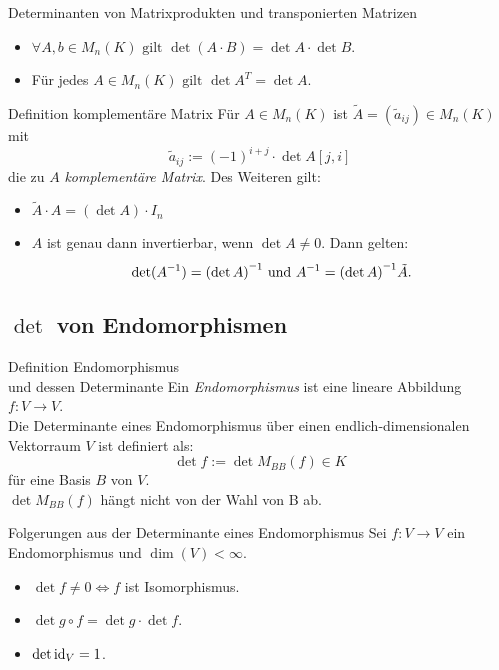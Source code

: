 \documentclass[main.tex]{subfiles}
\begin{document}
\begin{karte}{Determinanten von Matrixprodukten und transponierten Matrizen}
    \begin{itemize}
        \item \(\forall A,b \in M_n(K) \text{ gilt } 
        \det(A \cdot B) = \det A \cdot \det B\).
        \item Für jedes \(A \in M_n(K) \text{ gilt } 
        \det A^T = \det A\).
    \end{itemize}
\end{karte}
\begin{karte}{Definition komplementäre Matrix}
    Für \(A \in M_n(K)\) ist \(\tilde{A} = (\tilde{a}_{ij}) \in M_n(K)\) mit
    \[\tilde{a}_{ij} := {(-1)}^{i+j} \cdot \det A[j,i]\]
    die zu \(A\) \textit{komplementäre Matrix}.
    Des Weiteren gilt:
    \begin{itemize}
        \item \(\tilde{A} \cdot A = (\det A) \cdot I_n\)
        \item \(A\) ist genau dann invertierbar, wenn \(\det A \neq 0\). Dann gelten: 
        \[\det(\inverse A) = \inverse{(\det A)} \text{ und }
         \inverse A = \inverse{(\det A)} \tilde{A}.\]
    \end{itemize}
\end{karte}

\subsection*{\( \det \) von Endomorphismen}

\begin{karte}{Definition Endomorphismus\\und dessen Determinante}
    Ein \textit{Endomorphismus} ist eine lineare Abbildung 
    \( f: V \rightarrow V \).\\
    Die Determinante eines Endomorphismus über einen endlich-dimensionalen 
    Vektorraum \(V\) ist definiert als:
    \[ \det f := \det M_{BB}(f) \in K \]
    für eine Basis \(B\) von \(V\).\\
    \(\det M_{BB}(f)\) hängt nicht von der Wahl von B ab. 
\end{karte}
\begin{karte}{Folgerungen aus der Determinante eines Endomorphismus}
    Sei \(f: V \rightarrow V\) ein Endomorphismus und \( \dim(V) < \infty \).
    \begin{itemize}
        \item \(\det f \neq 0 \Leftrightarrow f\) ist Isomorphismus.
        \item \(\det g \circ f = \det g \cdot \det f\).
        \item \(\det \operatorname{id}_V = 1\).
    \end{itemize}
\end{karte}
\end{document}
